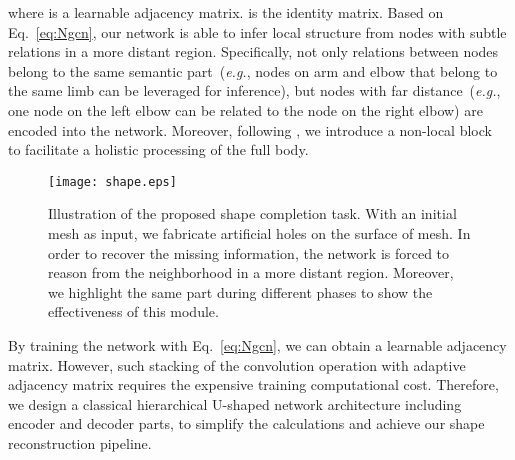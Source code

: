 \documentclass[sigplan]{acmart}
\def\eg{\emph{e.g.}}
\begin{document}
where  is a learnable adjacency matrix.  is the identity matrix. Based on Eq.~\eqref{eq:Ngcn}, our network is able to infer local structure from nodes with subtle relations in a more distant region. Specifically, not only relations between nodes belong to the same semantic part~(\eg, nodes on arm and elbow that belong to the same limb can be leveraged for inference), but nodes with far distance~(\eg, one node on the left elbow can be related to the node on the right elbow) are encoded into the network. Moreover, following \cite{stGCN_iccv19}, we introduce a non-local block ~\cite{Wang_2018_CVPR} to facilitate a holistic processing of the full body.

\begin{figure}[!t]
\centering
\texttt{[image: shape.eps]}
\caption{Illustration of the proposed shape completion task. With an initial mesh as input, we fabricate artificial holes on the surface of mesh. In order to recover the missing information, the network is forced to reason from the neighborhood in a more distant region. Moreover, we highlight the same part during different phases to show the effectiveness of this module.}
\label{pic:shape}
\end{figure}
By training the network with Eq.~\eqref{eq:Ngcn}, we can obtain a learnable adjacency matrix. However, such stacking of the convolution operation with adaptive adjacency matrix requires the expensive training computational cost. Therefore, we design a classical hierarchical U-shaped network architecture including encoder and decoder parts, to simplify the calculations and achieve our shape reconstruction pipeline.
\end{document}

